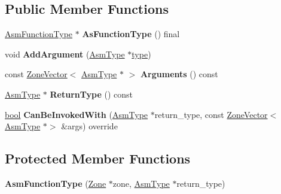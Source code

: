 \subsection*{Public Member Functions}
\begin{DoxyCompactItemize}
\item 
\mbox{\label{classv8_1_1internal_1_1wasm_1_1AsmFunctionType_a765ea31e183ab447cec9a8a4551ca439}} 
\mbox{\hyperlink{classv8_1_1internal_1_1wasm_1_1AsmFunctionType}{Asm\+Function\+Type}} $\ast$ {\bfseries As\+Function\+Type} () final
\item 
\mbox{\label{classv8_1_1internal_1_1wasm_1_1AsmFunctionType_aec0be33543a64faa165984d059fe1430}} 
void {\bfseries Add\+Argument} (\mbox{\hyperlink{classv8_1_1internal_1_1wasm_1_1AsmType}{Asm\+Type}} $\ast$\mbox{\hyperlink{classstd_1_1conditional_1_1type}{type}})
\item 
\mbox{\label{classv8_1_1internal_1_1wasm_1_1AsmFunctionType_a57403db551dfb5a6b16773dc01bca374}} 
const \mbox{\hyperlink{classv8_1_1internal_1_1ZoneVector}{Zone\+Vector}}$<$ \mbox{\hyperlink{classv8_1_1internal_1_1wasm_1_1AsmType}{Asm\+Type}} $\ast$ $>$ {\bfseries Arguments} () const
\item 
\mbox{\label{classv8_1_1internal_1_1wasm_1_1AsmFunctionType_a31072e786f860c2d0770f46d222dfa64}} 
\mbox{\hyperlink{classv8_1_1internal_1_1wasm_1_1AsmType}{Asm\+Type}} $\ast$ {\bfseries Return\+Type} () const
\item 
\mbox{\label{classv8_1_1internal_1_1wasm_1_1AsmFunctionType_ac1f821c6c3b43ce750230036751a42cf}} 
\mbox{\hyperlink{classbool}{bool}} {\bfseries Can\+Be\+Invoked\+With} (\mbox{\hyperlink{classv8_1_1internal_1_1wasm_1_1AsmType}{Asm\+Type}} $\ast$return\+\_\+type, const \mbox{\hyperlink{classv8_1_1internal_1_1ZoneVector}{Zone\+Vector}}$<$ \mbox{\hyperlink{classv8_1_1internal_1_1wasm_1_1AsmType}{Asm\+Type}} $\ast$$>$ \&args) override
\end{DoxyCompactItemize}
\subsection*{Protected Member Functions}
\begin{DoxyCompactItemize}
\item 
\mbox{\label{classv8_1_1internal_1_1wasm_1_1AsmFunctionType_a9ba684d23598a938ab7104bc01c28809}} 
{\bfseries Asm\+Function\+Type} (\mbox{\hyperlink{classv8_1_1internal_1_1Zone}{Zone}} $\ast$zone, \mbox{\hyperlink{classv8_1_1internal_1_1wasm_1_1AsmType}{Asm\+Type}} $\ast$return\+\_\+type)
\end{DoxyCompactItemize}


